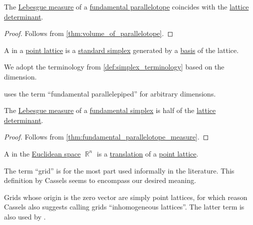 \begin{proposition}\label{thm:fundamental_parallelotope_measure}
  The \hyperref[def:lebesgue_measure]{Lebesgue measure} of a \hyperref[def:fundamental_parallelotope]{fundamental parallelotope} coincides with the \hyperref[def:point_lattice_determinant]{lattice determinant}.
\end{proposition}
\begin{proof}
  Follows from \cref{thm:volume_of_parallelotope}.
\end{proof}

\begin{definition}\label{def:fundamental_simplex}
  A  in a \hyperref[def:point_lattice]{point lattice} is a \hyperref[def:standard_simplex]{standard simplex} generated by a \hyperref[def:point_lattice_basis]{basis} of the lattice.

  We adopt the terminology from \cref{def:simplex_terminology} based on the dimension.
\end{definition}
\begin{comments}
  \item \Textcite[69]{Cassels1997NumberGeometry} uses the term \enquote{fundamental parallelepiped} for arbitrary dimensions.
\end{comments}

\begin{proposition}\label{thm:fundamental_simplex_measure}
  The \hyperref[def:lebesgue_measure]{Lebesgue measure} of a \hyperref[def:fundamental_simplex]{fundamental simplex} is half of the \hyperref[def:point_lattice_determinant]{lattice determinant}.
\end{proposition}
\begin{proof}
  Follows from \cref{thm:fundamental_parallelotope_measure}.
\end{proof}

\begin{definition}\label{def:euclidean_space_grid}
  A  in the \hyperref[def:euclidean_space]{Euclidean space} \( \BbbR^n \) is a \hyperref[def:rigid_motion/translation]{translation} of a \hyperref[def:point_lattice]{point lattice}.
\end{definition}
\begin{comments}
  \item The term \enquote{grid} is for the most part used informally in the literature. This definition by Cassels seems to encompass our desired meaning.

  \item Grids whose origin is the zero vector are simply point lattices, for which reason Cassels also suggests calling grids \enquote{inhomogeneous lattices}. The latter term is also used by \textcite[396]{Gruber2007ConvexAndDiscreteGeometry}.
\end{comments}

